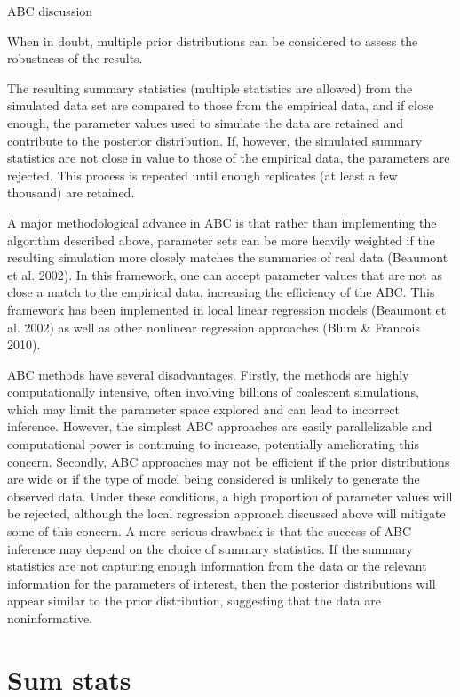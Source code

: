 ABC discussion 


When in doubt, multiple prior distributions can be considered to assess the robustness of the results. 

The resulting summary statistics (multiple statistics are allowed) from the simulated data set are compared to those from the empirical data, and if close enough, the parameter values used to simulate the data are retained and contribute to the posterior distribution. If, however, the simulated summary statistics are not close in value to those of the empirical data, the parameters are rejected. This process is repeated until enough replicates (at least a few thousand) are retained. 

A major methodological advance in ABC is that rather than implementing the algorithm described above, parameter sets can be more heavily weighted if the resulting simulation more closely matches the summaries of real data (Beaumont et al. 2002). In this framework, one can accept parameter values that are not as close a match to the empirical data, increasing the efficiency of the ABC. This framework has been implemented in local linear regression models (Beaumont et al. 2002) as well as other nonlinear regression approaches (Blum \& Francois 2010). 

ABC methods have several disadvantages. Firstly, the methods are highly computationally intensive, often involving billions of coalescent simulations, which may limit the parameter space explored and can lead to incorrect inference. However, the simplest ABC approaches are easily parallelizable and computational power is continuing to increase, potentially ameliorating this concern. Secondly, ABC approaches may not be efficient if the prior distributions are wide or if the type of model being considered is unlikely to generate the observed data. Under these conditions, a high proportion of parameter values will be rejected, although the local regression  approach discussed above will mitigate some of this concern. A more serious drawback is that the success of ABC inference may depend on the choice of summary statistics. If the summary statistics are not capturing enough information from the data or the relevant information for the parameters of interest, then the posterior distributions will appear similar to the prior distribution, suggesting that the data are noninformative. 

\section{Sum stats}

